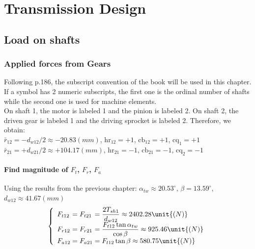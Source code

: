 \section{Transmission Design}
\subsection{Load on shafts}
\subsubsection{Applied forces from Gears}
Following p.186, the subscript convention of the book will be used in this chapter. If a symbol has 2 numeric subscripts, the first one is the ordinal number of shafts while the second one is used for machine elements.\\
On shaft 1, the motor is labeled 1 and the pinion is labeled 2. On shaft 2, the driven gear is labeled 1 and the driving sprocket is labeled 2. Therefore, we obtain:\\
$ \bar{r}_{12} = -d_{w12}/2 \approx -20.83\unit{(mm)}$, $ \text{hr}_{12} = +1 $, $ \text{cb}_{12} = +1 $, $ \text{cq}_1 = +1 $\\
$ \bar{r}_{21} = +d_{w21}/2 \approx +104.17\unit{(mm)}$, $ \text{hr}_{21} = -1 $, $ \text{cb}_{21} = -1$, $ \text{cq}_2 = -1$
\paragraph{Find magnitude of $ F_{t} $, $ F_r $, $ F_a $}
Using the results from the previous chapter: $ \alpha_{tw} \approx 20.53^\circ $, $ \beta = 13.59^\circ $, $ d_{w12}\approx 41.67\unit{(mm)} $
\[
\left\{ 
\begin{array}{l@{{}={}}l@{{}={}}l}
F_{t12}& F_{t21}& \dfrac{2T_{sh1}}{d_{w12}}\approx 2402.28\unit{(N)}\\
F_{r12}& F_{r21}&  \dfrac{F_{t12}\tan\alpha_{tw}}{\cos\beta}\approx 925.46 \unit{(N)}\\
F_{a12}& F_{a21}& F_{t12}\tan\beta\approx 580.75 \unit{(N)}\\ 
\end{array}
\right.
\]

